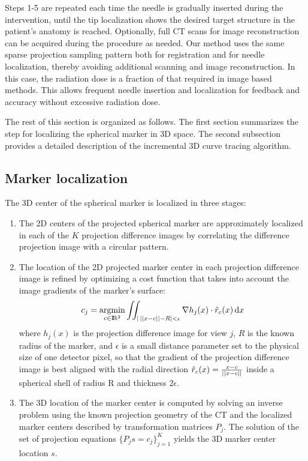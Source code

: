 Steps 1-5 are repeated each time the needle is gradually inserted during the intervention, until the tip localization shows the desired target structure in the patient's anatomy is reached. Optionally, full CT scans for image reconstruction can be acquired during the procedure as needed. Our method uses the same sparse projection sampling pattern both for registration and for needle localization, thereby avoiding additional scanning and image reconstruction. In this case, the radiation dose is a fraction of that required in image based methods. This allows frequent needle insertion and localization for feedback and accuracy without excessive radiation dose.

The rest of this section is organized as follows.
The first section summarizes the step for localizing the spherical marker in 3D space.
The second subsection provides a detailed description of the incremental 3D curve tracing algorithm.

\subsection*{\textbf{Marker localization}} \label{markerloc}
The 3D center of the spherical marker is localized in three stages:
\begin{enumerate}
    \item 
    {
    The 2D centers of the projected spherical marker are approximately localized in each of the $K$ projection difference images by correlating the difference projection image with a circular pattern. 
    }
    \item 
    {
    The location of the 2D projected marker center in each projection difference image is refined by optimizing a cost function that  takes into account the image gradients of the marker's surface:
    \begin{equation}
        c_j = \operatorname*{argmin}_{c \in \rm I\!R^2}{
        \iint_{\lvert \, \lvert\lvert x-c \rvert\rvert - R \rvert < \epsilon}
        {\nabla h_j(x) \cdot \hat{r}_c (x)} \, \mathrm{d}x}
    \end{equation}
    where $h_j(x)$ is the projection difference image for view $j$, $R$ is the known radius of the marker, and $\epsilon$ is a small distance parameter set to the physical size of one detector pixel, so that the gradient of the projection difference image is best aligned with the radial direction $\hat{r}_c (x) = \frac{x-c}{ \\\lvert\lvert x-c \rvert\rvert}$ inside a spherical shell of radius R and thickness $2\epsilon$.
    }
    \item
    {
    The 3D location of the marker center is computed by solving an inverse problem using the known projection geometry of the CT and the localized marker centers described by transformation matrices $P_j$. The solution of the set of projection equations $\{P_j s = c_j\}_{j=1}^K$  yields the 3D marker center location $s$.
    }
\end{enumerate}



